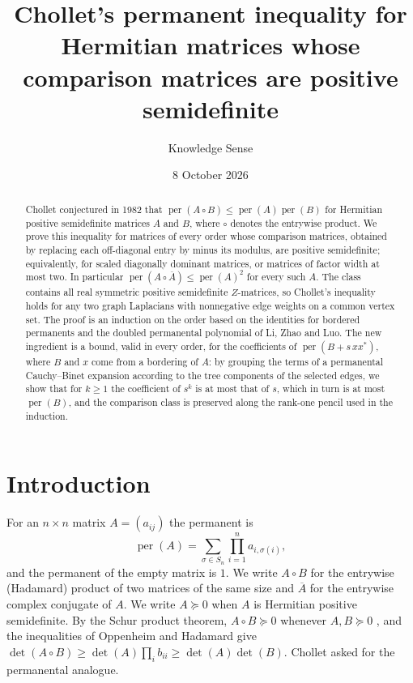 \documentclass[11pt]{amsart}
\theoremstyle{remark}
\numberwithin{equation}{section}
\newcommand{\per}{\operatorname{per}}
\newcommand{\conj}[1]{\overline{#1}}
\begin{document}
\title[Chollet's inequality and comparison matrices]{Chollet's permanent inequality for Hermitian matrices whose comparison matrices are positive semidefinite}

\author{Knowledge Sense}
\address{Knowledge Sense}

\date{8 October 2026}



\begin{abstract}
Chollet conjectured in 1982 that $\per(A\circ B)\le\per(A)\per(B)$ for Hermitian positive semidefinite matrices $A$ and $B$, where $\circ$ denotes the entrywise product. We prove this inequality for matrices of every order whose comparison matrices, obtained by replacing each off-diagonal entry by minus its modulus, are positive semidefinite; equivalently, for scaled diagonally dominant matrices, or matrices of factor width at most two. In particular $\per(A\circ\conj{A})\le\per(A)^2$ for every such $A$. The class contains all real symmetric positive semidefinite $Z$-matrices, so Chollet's inequality holds for any two graph Laplacians with nonnegative edge weights on a common vertex set. The proof is an induction on the order based on the identities for bordered permanents and the doubled permanental polynomial of Li, Zhao and Luo. The new ingredient is a bound, valid in every order, for the coefficients of $\per(B+s\,xx^*)$, where $B$ and $x$ come from a bordering of $A$: by grouping the terms of a permanental Cauchy--Binet expansion according to the tree components of the selected edges, we show that for $k\ge1$ the coefficient of $s^k$ is at most that of $s$, which in turn is at most $\per(B)$, and the comparison class is preserved along the rank-one pencil used in the induction.
\end{abstract}

\maketitle

\section{Introduction}

For an $n\times n$ matrix $A=(a_{ij})$ the permanent is
\[
\per(A)=\sum_{\sigma\in S_n}\prod_{i=1}^n a_{i,\sigma(i)},
\]
and the permanent of the empty matrix is $1$. We write $A\circ B$ for the entrywise (Hadamard) product of two matrices of the same size and $\conj{A}$ for the entrywise complex conjugate of $A$. We write $A\succeq 0$ when $A$ is Hermitian positive semidefinite. By the Schur product theorem, $A\circ B\succeq0$ whenever $A,B\succeq0$ \cite{HJ}, and the inequalities of Oppenheim and Hadamard give $\det(A\circ B)\ge\det(A)\prod_i b_{ii}\ge\det(A)\det(B)$. Chollet \cite{Cho} asked for the permanental analogue.
\end{document}
